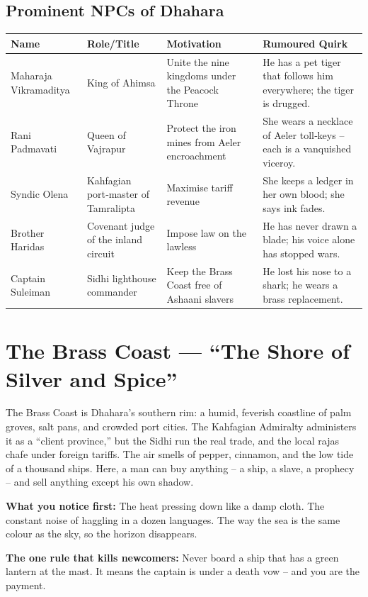 \documentclass[11pt]{book}
\begin{document}
\subsection*{Prominent NPCs of Dhahara}
\begin{longtable}{|p{}|p{}|p{}|p{}|}
\hline
\textbf{Name} & \textbf{Role/Title} & \textbf{Motivation} & \textbf{Rumoured Quirk} \\
\hline
Maharaja Vikramaditya & King of Ahimsa & Unite the nine kingdoms under the Peacock Throne & He has a pet tiger that follows him everywhere; the tiger is drugged. \\
\hline
Rani Padmavati & Queen of Vajrapur & Protect the iron mines from Aeler encroachment & She wears a necklace of Aeler toll‑keys – each is a vanquished viceroy. \\
\hline
Syndic Olena & Kahfagian port‑master of Tamralipta & Maximise tariff revenue & She keeps a ledger in her own blood; she says ink fades. \\
\hline
Brother Haridas & Covenant judge of the inland circuit & Impose law on the lawless & He has never drawn a blade; his voice alone has stopped wars. \\
\hline
Captain Suleiman & Sidhi lighthouse commander & Keep the Brass Coast free of Ashaani slavers & He lost his nose to a shark; he wears a brass replacement. \\
\hline
\end{longtable}

\section{The Brass Coast — ``The Shore of Silver and Spice''}
\label{sec:brass-coast}

\begin{tcolorbox}[colback=black!3,colframe=blue!60!black,title={Theme \& Atmosphere (Brass Coast)}]
The Brass Coast is Dhahara’s southern rim: a humid, feverish coastline of palm groves, salt pans, and crowded port cities. The Kahfagian Admiralty administers it as a “client province,” but the Sidhi run the real trade, and the local rajas chafe under foreign tariffs. The air smells of pepper, cinnamon, and the low tide of a thousand ships. Here, a man can buy anything – a ship, a slave, a prophecy – and sell anything except his own shadow.

\vspace{2mm}
\textbf{What you notice first:} The heat pressing down like a damp cloth. The constant noise of haggling in a dozen languages. The way the sea is the same colour as the sky, so the horizon disappears.

\textbf{The one rule that kills newcomers:} Never board a ship that has a green lantern at the mast. It means the captain is under a death vow – and you are the payment.
\end{tcolorbox}
\end{document}
